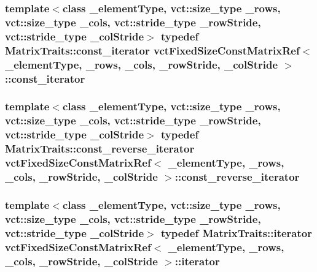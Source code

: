 \subsubsection[{const\+\_\+iterator}]{\setlength{\rightskip}{0pt plus 5cm}template$<$class \+\_\+element\+Type, vct\+::size\+\_\+type \+\_\+rows, vct\+::size\+\_\+type \+\_\+cols, vct\+::stride\+\_\+type \+\_\+row\+Stride, vct\+::stride\+\_\+type \+\_\+col\+Stride$>$ typedef {\bf Matrix\+Traits\+::const\+\_\+iterator} {\bf vct\+Fixed\+Size\+Const\+Matrix\+Ref}$<$ \+\_\+element\+Type, \+\_\+rows, \+\_\+cols, \+\_\+row\+Stride, \+\_\+col\+Stride $>$\+::{\bf const\+\_\+iterator}}\label{classvct_fixed_size_const_matrix_ref_ab035e90a0971ab4bf03d819b5bd31ecc}
\hypertarget{classvct_fixed_size_const_matrix_ref_a65f582be5b2d72ce89267a7255605844}{}
\subsubsection[{const\+\_\+reverse\+\_\+iterator}]{\setlength{\rightskip}{0pt plus 5cm}template$<$class \+\_\+element\+Type, vct\+::size\+\_\+type \+\_\+rows, vct\+::size\+\_\+type \+\_\+cols, vct\+::stride\+\_\+type \+\_\+row\+Stride, vct\+::stride\+\_\+type \+\_\+col\+Stride$>$ typedef {\bf Matrix\+Traits\+::const\+\_\+reverse\+\_\+iterator} {\bf vct\+Fixed\+Size\+Const\+Matrix\+Ref}$<$ \+\_\+element\+Type, \+\_\+rows, \+\_\+cols, \+\_\+row\+Stride, \+\_\+col\+Stride $>$\+::{\bf const\+\_\+reverse\+\_\+iterator}}\label{classvct_fixed_size_const_matrix_ref_a65f582be5b2d72ce89267a7255605844}
\hypertarget{classvct_fixed_size_const_matrix_ref_aabd708b8d6137ad684ee64e121c645b2}{}
\subsubsection[{iterator}]{\setlength{\rightskip}{0pt plus 5cm}template$<$class \+\_\+element\+Type, vct\+::size\+\_\+type \+\_\+rows, vct\+::size\+\_\+type \+\_\+cols, vct\+::stride\+\_\+type \+\_\+row\+Stride, vct\+::stride\+\_\+type \+\_\+col\+Stride$>$ typedef {\bf Matrix\+Traits\+::iterator} {\bf vct\+Fixed\+Size\+Const\+Matrix\+Ref}$<$ \+\_\+element\+Type, \+\_\+rows, \+\_\+cols, \+\_\+row\+Stride, \+\_\+col\+Stride $>$\+::{\bf iterator}}\label{classvct_fixed_size_const_matrix_ref_aabd708b8d6137ad684ee64e121c645b2}
\hypertarget{classvct_fixed_size_const_matrix_ref_ac6b99932c13ec23f2c083fc719af757e}{}
